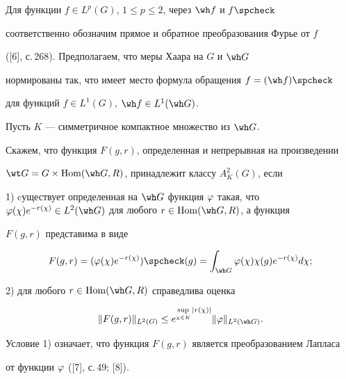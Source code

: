 




Для функции $f\in L^p(G)$, $1\le p\le2$, через $\wh f$ и $f\spcheck$


соответственно обозначим прямое и обратное преобразования Фурье от $f$


([6], с.\,268). Предполагаем, что меры Хаара на $G$ и $\wh G$ 


нормированы так, что имеет место формула обращения $f={(\wh f)}\spcheck$


для функций $f\in L^1(G)$, $\wh f\in L^1(\wh G)$. 





\begin{defn}\label{op2}


Пусть $K$ --- симметричное компактное множество из ${\wh G}$. 


Скажем, что функция $F(g,r)$, определенная и непрерывная на произведении 


$\wt G=G\ti\mathrm{Hom}(\wh G,R)$, принадлежит классу $A^2_K(G)$, если





1) cуществует определенная на $\wh G$ функция $\vp$ такая, что $\vp(\chi)


e^{-r(\chi)}\in L^2(\wh G)$ для любого $r\in\mh (\wh G,R)$, а функция


$F(g,r)$ представима в виде


\begin{equation}\label{e3}


F(g,r)={(\vp(\chi)e^{-r(\chi)})}\spcheck(g)=\int_{\wh G}\vp(\chi)\chi(g)


e^{-r(\chi)}d\chi;


\end{equation}





2) для любого $r\in\mh (\wh G,R)$ справедлива оценка


\begin{equation}\label{e4}


\|F(g,r)\|_{L^2(G)}\le e^{\sup\li_{\chi\in K}|r(\chi)|}


\|\vp\|_{L^2(\wh G)}.


\end{equation}





Условие 1) означает, что функция $F(g,r)$ является преобразованием Лапласа


от функции $\varphi$ ([7], с.\,49; [8]).


\end{defn}





